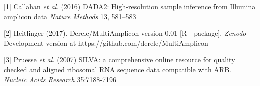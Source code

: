 \documentclass[30pt, a0paper, portrait, margin=0mm, innermargin=15mm,
               blockverticalspace=15mm, colspace=15mm, subcolspace=8mm]{tikzposter}
\begin{document}
\begin{columns}
{\begin{small}
          \hangindent=2cm [1] Callahan \textit{et al.} (2016) DADA2:
          High-resolution sample inference from Illumina amplicon data
          \textit{Nature Methods} 13, 581--583

          \hangindent=2cm [2] Heitlinger (2017). Derele/MultiAmplicon
          version 0.01 [R - package]. \textit{Zenodo} Development
          version at https://github.com/derele/MultiAmplicon

          \hangindent=2cm [3] Pruesse \textit{et al.} (2007) SILVA: a
          comprehensive online resource for quality checked and
          aligned ribosomal RNA sequence data compatible with
          ARB. \textit{Nucleic Acids Research} 35:7188-7196

          
        \end{small}
      }


\end{columns}

\end{document}
